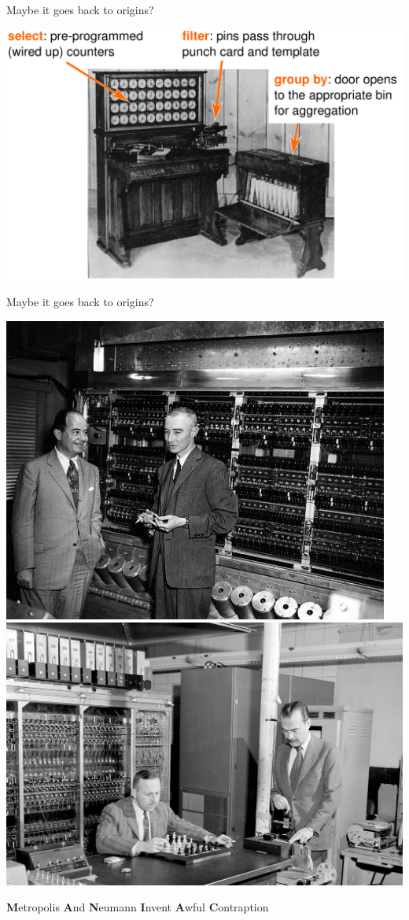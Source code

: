 \documentclass[aspectratio=169]{beamer}
\begin{document}
\begin{frame}{Maybe it goes back to origins?}
\vspace{0.25 cm}
\begin{center}
\includegraphics[width=0.83\linewidth]{hh-tabulator.pdf}
\end{center}
\end{frame}

\begin{frame}{Maybe it goes back to origins?}
\vspace{0.5 cm}

\includegraphics[height=5 cm]{neumann_oppie.jpg} \includegraphics[height=5 cm]{metropolis.jpg}

\begin{center}
\Large {\bf M}etropolis {\bf A}nd {\bf N}eumann {\bf I}nvent {\bf A}wful {\bf C}ontraption
\end{center}
\end{frame}
\end{document}
